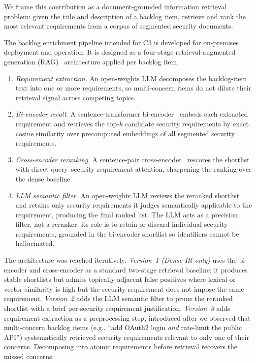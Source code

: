 We frame this contribution as a document-grounded information retrieval problem: given the title and description of a backlog item, retrieve and rank the most relevant requirements from a corpus of segmented security documents.

The backlog enrichment pipeline intended for C3 is developed for on-premises deployment and operation. It is designed as a four-stage retrieval-augmented generation (RAG)~\cite{lewis2020rag} architecture applied per backlog item.
\begin{enumerate}
    \item \emph{Requirement extraction.} An open-weights LLM decomposes the backlog-item text into one or more requirements, so multi-concern items do not dilute their retrieval signal across competing topics.
    \item \emph{Bi-encoder recall.} A sentence-transformer bi-encoder~\cite{reimers2019sbert} embeds each extracted requirement and retrieves the top-$k$ candidate security requirements by exact cosine similarity over precomputed embeddings of all segmented security requirements.
    \item \emph{Cross-encoder reranking.} A sentence-pair cross-encoder~\cite{nogueira2019bert} rescores the shortlist with direct query--security requirement attention, sharpening the ranking over the dense baseline.
    \item \emph{LLM semantic filter.} An open-weights LLM reviews the reranked shortlist and retains only security requirements it judges semantically applicable to the requirement, producing the final ranked list. The LLM acts as a precision filter, not a reranker: its role is to retain or discard individual security requirements, grounded in the bi-encoder shortlist so identifiers cannot be hallucinated.
\end{enumerate}


The architecture was reached iteratively.
\emph{Version~1 (Dense IR only)} uses the bi-encoder and cross-encoder as a standard two-stage retrieval baseline; it produces stable shortlists but admits topically adjacent false positives where lexical or vector similarity is high but the security requirement does not impose the same requirement.
\emph{Version~2} adds the LLM semantic filter to prune the reranked shortlist with a brief per-security requirement justification.
\emph{Version~3} adds requirement extraction as a preprocessing step, introduced after we observed that multi-concern backlog items (e.g., ``add OAuth2 login \emph{and} rate-limit the public API'') systematically retrieved security requirements relevant to only one of their concerns. Decomposing into atomic requirements before retrieval recovers the missed concerns.

